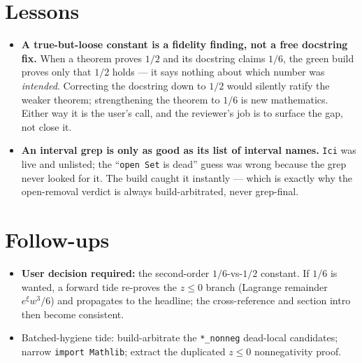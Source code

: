 \documentclass[11pt]{article}
\begin{document}
\section{Lessons}
\begin{itemize}[noitemsep]
  \item \textbf{A true-but-loose constant is a fidelity finding, not a free docstring fix.} When a
    theorem proves $1/2$ and its docstring claims $1/6$, the green build proves only that $1/2$ holds
    --- it says nothing about which number was \emph{intended}. Correcting the docstring down to $1/2$
    would silently ratify the weaker theorem; strengthening the theorem to $1/6$ is new mathematics.
    Either way it is the user's call, and the reviewer's job is to surface the gap, not close it.
  \item \textbf{An interval grep is only as good as its list of interval names.} \texttt{Ici} was live
    and unlisted; the ``\texttt{open Set} is dead'' guess was wrong because the grep never looked for
    it. The build caught it instantly --- which is exactly why the open-removal verdict is always
    build-arbitrated, never grep-final.
\end{itemize}

\section{Follow-ups}
\begin{itemize}[noitemsep]
  \item \textbf{User decision required:} the second-order $1/6$-vs-$1/2$ constant. If $1/6$ is wanted,
    a forward tide re-proves the $z\le0$ branch (Lagrange remainder $e^{\xi}w^3/6$) and propagates to
    the headline; the cross-reference and section intro then become consistent.
  \item Batched-hygiene tide: build-arbitrate the \texttt{*\_nonneg} dead-local candidates; narrow
    \texttt{import Mathlib}; extract the duplicated $z\le0$ nonnegativity proof.
\end{itemize}
\end{document}
